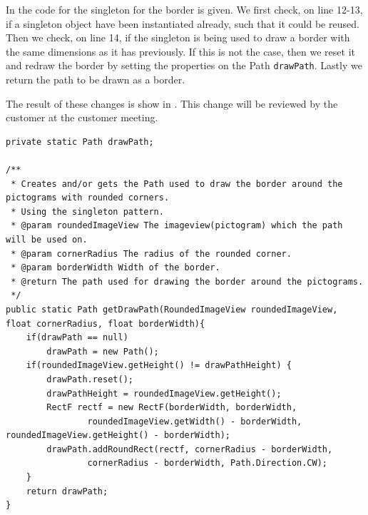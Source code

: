 In  the code for the singleton for the border is given.
We first check, on line 12-13, if a singleton object have been instantiated already, such that it could be reused.
Then we check, on line 14, if the singleton is being used to draw a border with the same dimensions as it has previously.
If this is not the case, then we reset it and redraw the border by setting the properties on the Path \texttt{drawPath}.
Lastly we return the path to be drawn as a border.

The result of these changes is show in .
This change will be reviewed by the customer at the customer meeting.

\begin{lstlisting}[float, floatplacement=h, caption={One of the singletons used to solve this task.}, label={lst:singleton_example}]
private static Path drawPath;

/**
 * Creates and/or gets the Path used to draw the border around the pictograms with rounded corners.
 * Using the singleton pattern.
 * @param roundedImageView The imageview(pictogram) which the path will be used on.
 * @param cornerRadius The radius of the rounded corner.
 * @param borderWidth Width of the border.
 * @return The path used for drawing the border around the pictograms.
 */
public static Path getDrawPath(RoundedImageView roundedImageView, float cornerRadius, float borderWidth){
    if(drawPath == null)
        drawPath = new Path();
    if(roundedImageView.getHeight() != drawPathHeight) {
        drawPath.reset();
        drawPathHeight = roundedImageView.getHeight();
        RectF rectf = new RectF(borderWidth, borderWidth,
                roundedImageView.getWidth() - borderWidth, roundedImageView.getHeight() - borderWidth);
        drawPath.addRoundRect(rectf, cornerRadius - borderWidth,
                cornerRadius - borderWidth, Path.Direction.CW);
    }
    return drawPath;
}
\end{lstlisting}

